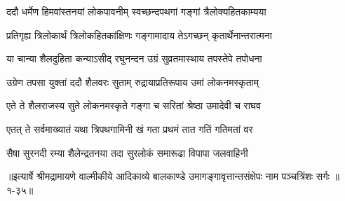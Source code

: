 \twolineshloka
{ददौ धर्मेण हिमवांस्तनयां लोकपावनीम्}
{स्वच्छन्दपथगां गङ्गां त्रैलोक्यहितकाम्यया} %

\twolineshloka
{प्रतिगृह्य त्रिलोकार्थं त्रिलोकहितकांक्षिणः}
{गङ्गामादाय तेऽगच्छन् कृतार्थेनान्तरात्मना} %

\twolineshloka
{या चान्या शैलदुहिता कन्याऽसीद् रघुनन्दन}
{उग्रं सुव्रतमास्थाय तपस्तेपे तपोधना} %

\twolineshloka
{उग्रेण तपसा युक्तां ददौ शैलवरः सुताम्}
{रुद्रायाप्रतिरूपाय उमां लोकनमस्कृताम्} %

\twolineshloka
{एते ते शैलराजस्य सुते लोकनमस्कृते}
{गङ्गा च सरितां श्रेष्ठा उमादेवी च राघव} %

\twolineshloka
{एतत् ते सर्वमाख्यातं यथा त्रिपथगामिनी}
{खं गता प्रथमं तात गतिं गतिमतां वर} %

\twolineshloka
{सैषा सुरनदी रम्या शैलेन्द्रतनया तदा}
{सुरलोकं समारूढा विपापा जलवाहिनी} %


॥इत्यार्षे श्रीमद्रामायणे वाल्मीकीये आदिकाव्ये बालकाण्डे उमागङ्गावृत्तान्तसंक्षेपः नाम पञ्चत्रिंशः सर्गः ॥१-३५॥
